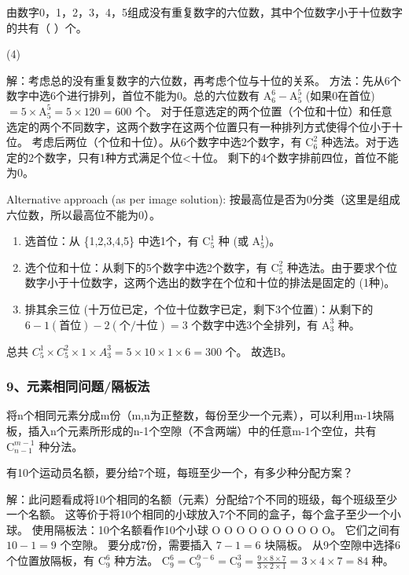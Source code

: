 \begin{example}
    由数字0，1，2，3，4，5组成没有重复数字的六位数，其中个位数字小于十位数字的共有（ ）个。
    \begin{tasks}(4)
    \end{tasks}
\end{example}
\begin{solution}
    解：考虑总的没有重复数字的六位数，再考虑个位与十位的关系。
    方法：先从6个数字中选6个进行排列，首位不能为0。总的六位数有 $\mathrm{A}_{6}^{6} - \mathrm{A}_{5}^{5}$ (如果0在首位) $= 5 \times \mathrm{A}_{5}^{5} = 5 \times 120 = 600$ 个。
    对于任意选定的两个位置（个位和十位）和任意选定的两个不同数字，这两个数字在这两个位置只有一种排列方式使得个位小于十位。
    考虑后两位（个位和十位）。从6个数字中选2个数字，有 $\mathrm{C}_{6}^{2}$ 种选法。对于选定的2个数字，只有1种方式满足个位<十位。
    剩下的4个数字排前四位，首位不能为0。

    Alternative approach (as per image solution):
    按最高位是否为0分类（这里是组成六位数，所以最高位不能为0）。
    \begin{enumerate}
        \item 选首位：从 \{1,2,3,4,5\} 中选1个，有 $\mathrm{C}_{5}^{1}$ 种 (或 $\mathrm{A}_{5}^{1}$)。
        \item 选个位和十位：从剩下的5个数字中选2个数字，有 $\mathrm{C}_{5}^{2}$ 种选法。由于要求个位数字小于十位数字，这两个选出的数字在个位和十位的排法是固定的 (1种)。
        \item 排其余三位 (十万位已定，个位十位数字已定，剩下3个位置)：从剩下的 $6-1(\text{首位})-2(\text{个/十位})=3$ 个数字中选3个全排列，有 $\mathrm{A}_{3}^{3}$ 种。
    \end{enumerate}
    总共 $C_{5}^{1} \times C_{5}^{2} \times 1 \times A_{3}^{3} = 5 \times 10 \times 1 \times 6 = 300$ 个。
    故选B。
\end{solution}

\subsubsection{9、元素相同问题/隔板法\*}
将n个相同元素分成m份（m,n为正整数，每份至少一个元素），可以利用m-1块隔板，插入n个元素所形成的n-1个空隙（不含两端）中的任意m-1个空位，共有 $\mathrm{C}_{n-1}^{m-1}$ 种分法。

\begin{example}
    有10个运动员名额，要分给7个班，每班至少一个，有多少种分配方案？
\end{example}
\begin{solution}
    解：此问题看成将10个相同的名额（元素）分配给7个不同的班级，每个班级至少一个名额。
    这等价于将10个相同的小球放入7个不同的盒子，每个盒子至少一个小球。
    使用隔板法：10个名额看作10个小球 O O O O O O O O O O。
    它们之间有 $10-1=9$ 个空隙。
    要分成7份，需要插入 $7-1=6$ 块隔板。
    从9个空隙中选择6个位置放隔板，有 $\mathrm{C}_{9}^{6}$ 种方法。
    $\mathrm{C}_{9}^{6} = \mathrm{C}_{9}^{9-6} = \mathrm{C}_{9}^{3} = \frac{9 \times 8 \times 7}{3 \times 2 \times 1} = 3 \times 4 \times 7 = 84$ 种。
\end{solution}


